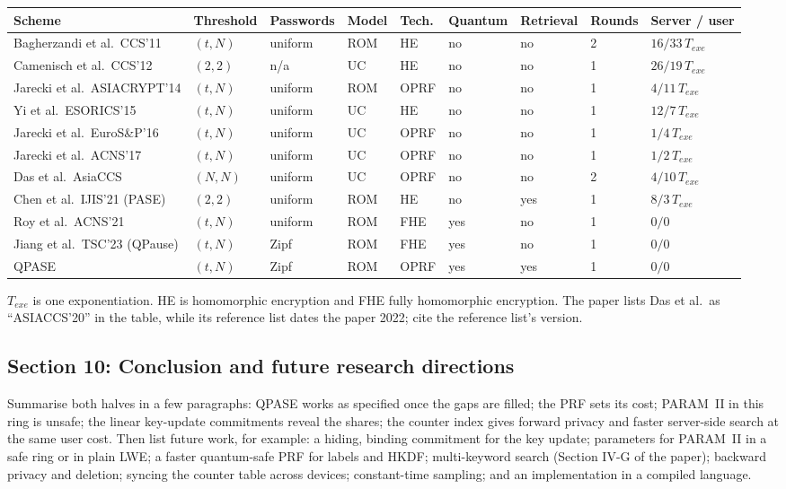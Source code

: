 \documentclass[11pt,a4paper]{article}
\begin{document}
{\small
\begin{tabularx}{\linewidth}{Xllllllll}
\toprule
\textbf{Scheme} & \textbf{Threshold} & \textbf{Passwords} & \textbf{Model} & \textbf{Tech.} & \textbf{Quantum} &
\textbf{Retrieval} & \textbf{Rounds} & \textbf{Server / user} \\
\midrule
Bagherzandi et al.\ CCS'11 & $(t,N)$ & uniform & ROM & HE & no & no & 2 & $16 / 33\,T_{exe}$ \\
Camenisch et al.\ CCS'12 & $(2,2)$ & n/a & UC & HE & no & no & 1 & $26 / 19\,T_{exe}$ \\
Jarecki et al.\ ASIACRYPT'14 & $(t,N)$ & uniform & ROM & OPRF & no & no & 1 & $4 / 11\,T_{exe}$ \\
Yi et al.\ ESORICS'15 & $(t,N)$ & uniform & UC & HE & no & no & 1 & $12 / 7\,T_{exe}$ \\
Jarecki et al.\ EuroS\&P'16 & $(t,N)$ & uniform & UC & OPRF & no & no & 1 & $1 / 4\,T_{exe}$ \\
Jarecki et al.\ ACNS'17 & $(t,N)$ & uniform & UC & OPRF & no & no & 1 & $1 / 2\,T_{exe}$ \\
Das et al.\ AsiaCCS & $(N,N)$ & uniform & UC & OPRF & no & no & 2 & $4 / 10\,T_{exe}$ \\
Chen et al.\ IJIS'21 (PASE) & $(2,2)$ & uniform & ROM & HE & no & yes & 1 & $8 / 3\,T_{exe}$ \\
Roy et al.\ ACNS'21 & $(t,N)$ & uniform & ROM & FHE & yes & no & 1 & $0 / 0$ \\
Jiang et al.\ TSC'23 (QPause) & $(t,N)$ & Zipf & ROM & FHE & yes & no & 1 & $0 / 0$ \\
QPASE & $(t,N)$ & Zipf & ROM & OPRF & yes & yes & 1 & $0 / 0$ \\
\bottomrule
\end{tabularx}
}

$T_{exe}$ is one exponentiation. HE is homomorphic encryption and FHE fully homomorphic encryption. The paper
lists Das et al.\ as ``ASIACCS'20'' in the table, while its reference list dates the paper 2022; cite the reference
list's version.

\subsection{Section 10: Conclusion and future research directions}

Summarise both halves in a few paragraphs: QPASE works as specified once the gaps are filled; the PRF sets its
cost; PARAM~II in this ring is unsafe; the linear key-update commitments reveal the shares; the counter index gives forward
privacy and faster server-side search at the same user cost. Then list future work, for example: a hiding,
binding commitment for the key update; parameters for PARAM~II in a safe ring or in plain LWE; a faster
quantum-safe PRF for labels and HKDF; multi-keyword search (Section IV-G of the paper); backward privacy and
deletion; syncing the counter table across devices; constant-time sampling; and an implementation in a compiled
language.
\end{document}
